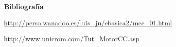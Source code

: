 \documentclass[12pt]{article}
\begin{document}
\vspace{\baselineskip}

\vspace{\baselineskip}

\vspace{\baselineskip}

\vspace{\baselineskip}

\vspace{\baselineskip}

\vspace{\baselineskip}

\vspace{\baselineskip}
{\fontsize{15pt}{18.0pt}\selectfont \textbf{Bibliografía}\par}\par

\href{http://perso.wanadoo.es/luis_ju/ebasica2/mcc_01.html}{http://perso.wanadoo.es/luis\_ju/ebasica2/mcc\_01.html}\par

\setlength{\parskip}{6.96pt}
\href{http://www.unicrom.com/Tut_MotorCC.asp}{http://www.unicrom.com/Tut\_MotorCC.asp}\par


\printbibliography
\end{document}
